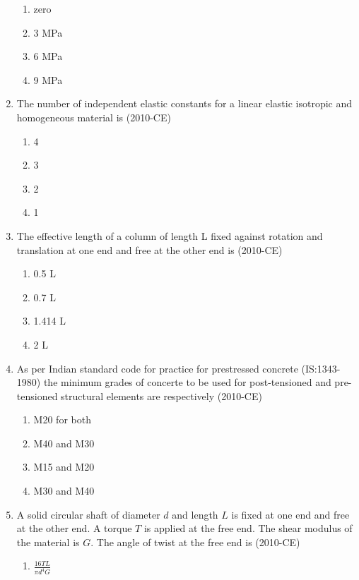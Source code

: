 \documentclass[journal,12pt,twocolumn]{IEEEtran}
\theoremstyle{remark}
\begin{document}
\begin{enumerate}
\begin{enumerate}
	\item zero
		\item 3 MPa
		\item 6 MPa
		\item 9 MPa
\end{enumerate}
	
\item The number of independent elastic constants for a linear elastic isotropic and homogeneous material is \hfill{(2010-CE)}

\begin{enumerate}
	\item 4
	\item 3
	\item 2
	\item 1
\end{enumerate}
			 
\item The effective length of a column of length L fixed against rotation and translation at one end and free at the other end is \hfill{(2010-CE)}

\begin{enumerate}
	\item 0.5 L
\item 0.7 L
\item 1.414 L
\item 2 L

\end{enumerate}

\item As per Indian standard code for practice for prestressed concrete (IS:1343-1980) the minimum grades of concerte to be used for post-tensioned and pre-tensioned structural elements are respectively \hfill{(2010-CE)}

\begin{enumerate}
\item M20 for both
 \item M40 and M30
 \item M15 and M20
 \item M30 and M40
\end{enumerate}


\item A solid circular shaft of diameter $d$ and length $L$ is fixed at one end and free at the other end. A torque $T$ is applied at the free end. The shear modulus of the material is $G$. The angle of twist at the free end is \hfill{(2010-CE)}

\begin{enumerate}
				\item $\frac{16TL}{\pi d^{4} G}$


\end{enumerate}
\end{enumerate}
\end{document}
